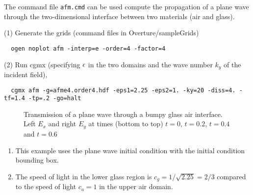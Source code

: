 \documentclass{article}
\begin{document}
The command file {\tt afm.cmd} can be used compute the propagation of a plane wave through the 
two-dimensional interface between two materials (air and glass).

\noindent (1) Generate the grids (command files in Overture/sampleGrids)
{\small
\begin{verbatim}
  ogen noplot afm -interp=e -order=4 -factor=4
\end{verbatim}
}
\noindent (2) Run cgmx (specifying $\epsilon$ in the two domains and the wave number $k_y$ of the incident field), 
{\small
\begin{verbatim}
  cgmx afm -g=afme4.order4.hdf -eps1=2.25 -eps2=1. -ky=20 -diss=4. -tf=1.4 -tp=.2 -go=halt
\end{verbatim}
}
{
\begin{figure}[hbt]
\newcommand{\figWidth}{7.0cm}
\newcommand{\trimfig}[2]{\trimFig{#1}{#2}{0.25}{0.25}{.45}{.425}}
\begin{center}
\end{center}
\caption{Transmission of a plane wave through a bumpy glass air interface. Left $E_x$ and right $E_y$ at times (bottom to top) 
  $t=0$, $t=0.2$, $t=0.4$ and $t=0.6$}
\label{fig:scatBump2d}
\end{figure}
}

\begin{enumerate}
  \item This example uses the plane wave initial condition with the initial condition bounding box.
  \item The speed of light in the lower glass region is $c_g =1/\sqrt{2.25} = 2/3$ compared to the speed of light $c_a=1$ in the
      upper air domain. 
\end{enumerate}
\end{document}
